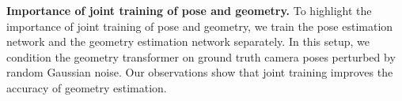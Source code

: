 % 
\noindent\textbf{Importance of joint training of pose and geometry.}
To highlight the importance of joint training of pose and geometry, we train the pose estimation network and the geometry estimation network separately. In this setup, we condition the geometry transformer on ground truth camera poses perturbed by random Gaussian noise. Our observations show that joint training improves the accuracy of geometry estimation.
\fi
    

